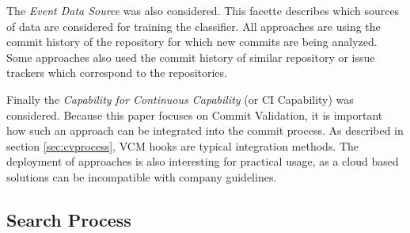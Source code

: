 The \textit{Event Data Source} was also considered. This facette describes which sources of data are considered for training the classifier. All approaches are using the commit history of the repository for which new commits are being analyzed. Some approaches also used the commit history of similar repository or issue trackers which correspond to the repositories.

Finally the \textit{Capability for Continuous Capability} (or CI Capability) was considered. Because this paper focuses on Commit Validation, it is important how such an approach can be integrated into the commit process. As described in section \ref{sec:cvprocess}, VCM hooks are typical integration methods. The deployment of approaches is also interesting for practical usage, as a cloud based solutions can be incompatible with company guidelines.


\subsection{Search Process}


